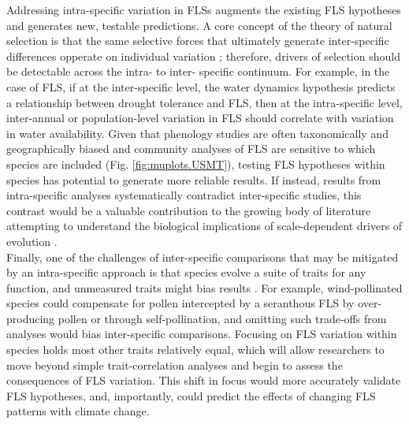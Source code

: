 \documentclass{article}
\begin{document}
\noindent Addressing intra-specific variation in FLSs augments the existing FLS hypotheses and generates new, testable predictions. A core concept of the theory of natural selection is that the same selective forces that ultimately generate inter-specific differences opperate on individual variation \citep{Dobzhansky1982, Schluter1996}; therefore, drivers of selection should be detectable across the intra- to inter- specific continuum. For example, in the case of FLS, if at the inter-specific level, the water dynamics hypothesis predicts a relationship between drought tolerance and FLS, then at the intra-specific level, inter-annual or population-level variation in FLS should correlate with variation in water availability. Given that phenology studies are often taxonomically and geographically biased \citep{Wolkovich2014,Willis2017} and community analyses of FLS are sensitive to which species are included (Fig. \ref{fig:muplots.USMT}), testing FLS hypotheses within species has potential to generate more reliable results. If instead, results from intra-specific analyses systematically contradict inter-specific studies, this contrast would be a valuable contribution to the growing body of literature attempting to understand the biological implications of scale-dependent drivers of evolution \citep[e.g.,][]{Violle2012,Shipley2016,Anderegg2018}.  \\ %
 
\noindent Finally, one of the challenges of inter-specific comparisons that may be mitigated by an intra-specific approach is that species evolve a suite of traits for any function, and unmeasured traits might bias results \citep{Davies2019}. For example, wind-pollinated species could compensate for pollen intercepted by a seranthous FLS by over-producing pollen or through self-pollination, and omitting such trade-offs from analyses would bias inter-specific comparisons. Focusing on FLS variation within species holds most other traits relatively equal, which will allow researchers to move beyond simple trait-correlation analyses and begin to assess the consequences of FLS variation. This shift in focus would more accurately validate FLS hypotheses, and, importantly, could predict the effects of changing FLS patterns with climate change. \\
\end{document}
